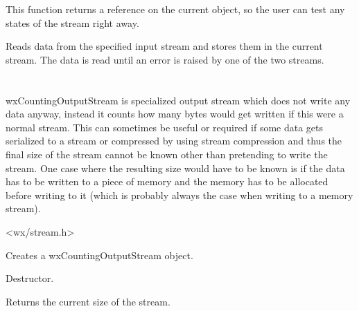 This function returns a reference on the current object, so the user can test
any states of the stream right away.


Reads data from the specified input stream and stores them 
in the current stream. The data is read until an error is raised
by one of the two streams.

\section{}\label{wxcountingoutputstream}

wxCountingOutputStream is specialized output stream which does not write any data anyway,
instead it counts how many bytes would get written if this were a normal stream. This
can sometimes be useful or required if some data gets serialized to a stream or compressed
by using stream compression and thus the final size of the stream cannot be known other
than pretending to write the stream. One case where the resulting size would have to be
known is if the data has to be written to a piece of memory and the memory has to be
allocated before writing to it (which is probably always the case when writing to a 
memory stream).




<wx/stream.h>



Creates a wxCountingOutputStream object.



Destructor.



Returns the current size of the stream.
